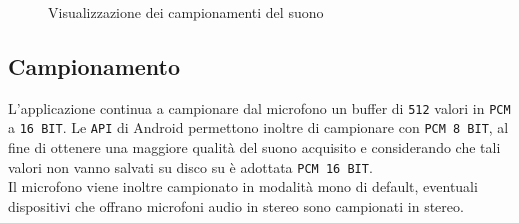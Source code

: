 \begin{figure}[!ht]
\begin{center}
\caption{Visualizzazione dei campionamenti del suono}
\label{img:microphone}
\end{center}
\end{figure}

\subsection{Campionamento}
L'applicazione continua a campionare dal microfono un buffer di \texttt{512} valori in \texttt{PCM} a \texttt{16 BIT}.
Le \texttt{API} di Android permettono inoltre di campionare con \texttt{PCM 8 BIT}, al fine di ottenere una maggiore qualità del suono acquisito e considerando che tali valori non vanno salvati su disco su è adottata \texttt{PCM 16 BIT}.\\
Il microfono viene inoltre campionato in modalità mono di default, eventuali dispositivi che offrano microfoni audio in stereo sono campionati in stereo.\\

